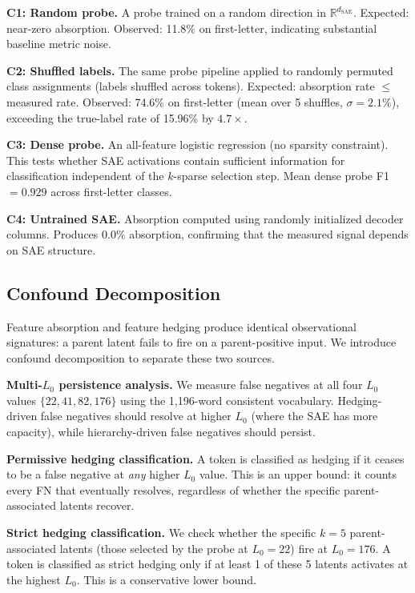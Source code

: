 \documentclass{article}
\begin{document}
\textbf{C1: Random probe.} A probe trained on a random direction in $\mathbb{R}^{d_{\text{SAE}}}$. Expected: near-zero absorption. Observed: 11.8\% on first-letter, indicating substantial baseline metric noise.

\textbf{C2: Shuffled labels.} The same probe pipeline applied to randomly permuted class assignments (labels shuffled across tokens). Expected: absorption rate $\leq$ measured rate. Observed: 74.6\% on first-letter (mean over 5 shuffles, $\sigma = 2.1\%$), exceeding the true-label rate of 15.96\% by $4.7\times$.

\textbf{C3: Dense probe.} An all-feature logistic regression (no sparsity constraint). This tests whether SAE activations contain sufficient information for classification independent of the $k$-sparse selection step. Mean dense probe F1 $= 0.929$ across first-letter classes.

\textbf{C4: Untrained SAE.} Absorption computed using randomly initialized decoder columns. Produces 0.0\% absorption, confirming that the measured signal depends on SAE structure.

\subsection{Confound Decomposition}
\label{sec:confound}

Feature absorption and feature hedging produce identical observational signatures: a parent latent fails to fire on a parent-positive input. We introduce confound decomposition to separate these two sources.

\textbf{Multi-$L_0$ persistence analysis.} We measure false negatives at all four $L_0$ values $\{22, 41, 82, 176\}$ using the 1,196-word consistent vocabulary. Hedging-driven false negatives should resolve at higher $L_0$ (where the SAE has more capacity), while hierarchy-driven false negatives should persist.

\textbf{Permissive hedging classification.} A token is classified as hedging if it ceases to be a false negative at \emph{any} higher $L_0$ value. This is an upper bound: it counts every FN that eventually resolves, regardless of whether the specific parent-associated latents recover.

\textbf{Strict hedging classification.} We check whether the specific $k = 5$ parent-associated latents (those selected by the probe at $L_0 = 22$) fire at $L_0 = 176$. A token is classified as strict hedging only if at least 1 of these 5 latents activates at the highest $L_0$. This is a conservative lower bound.
\end{document}
